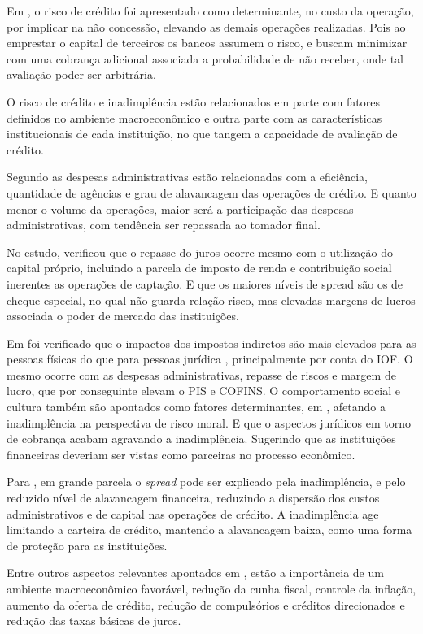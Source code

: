 \documentclass[
  12pt,
  12pt,
  openright,
  oneside,
  a4paper,
  chapter=TITLE,
  section=TITLE,
  subsection=TITLE,
  subsubsection=TITLE,
  english,
  portugues,
  sumario=tradicional]{abntex2}
\begin{document}
Em \textcite{BCB:1999}, o risco de crédito foi apresentado como determinante, no custo da operação, por implicar na não concessão, elevando as demais operações realizadas. Pois ao emprestar o capital de terceiros os bancos assumem o risco, e buscam minimizar com uma cobrança adicional associada a probabilidade de não receber, onde tal avaliação poder ser arbitrária.

O risco de crédito e inadimplência estão relacionados em parte com fatores definidos no ambiente macroeconômico e outra parte com as características institucionais de cada instituição, no que tangem a capacidade de avaliação de crédito.

Segundo \textcite{BCB:1999} as despesas administrativas estão relacionadas com a eficiência, quantidade de agências e grau de alavancagem das operações de crédito. E quanto menor o volume da operações, maior será a participação das despesas administrativas, com tendência ser repassada ao tomador final.

No estudo, \textcite{BCB:1999} verificou que o repasse do juros ocorre mesmo com o utilização do capital próprio, incluindo a parcela de imposto de renda e contribuição social inerentes as operações de captação. E que os maiores níveis de spread são os de cheque especial, no qual não guarda relação risco, mas elevadas margens de lucros associada o poder de mercado das instituições.

Em \textcite{BCB:1999} foi verificado que o impactos dos impostos indiretos são mais elevados para as pessoas físicas do que para pessoas jurídica , principalmente por conta do IOF. O mesmo ocorre com as despesas administrativas, repasse de riscos e margem de lucro, que por conseguinte elevam o PIS e COFINS.
O comportamento social e cultura também são apontados como fatores determinantes, em \textcite{BCB:1999}, afetando a inadimplência na perspectiva de risco moral. E que o aspectos jurídicos em torno de cobrança acabam agravando a inadimplência. Sugerindo que as instituições financeiras deveriam ser vistas como parceiras no processo econômico.

Para \textcite{BCB:1999}, em grande parcela o \emph{spread} pode ser explicado pela inadimplência, e pelo reduzido nível de alavancagem financeira, reduzindo a dispersão dos custos administrativos e de capital nas operações de crédito. A inadimplência age limitando a carteira de crédito, mantendo a alavancagem baixa, como uma forma de proteção para as instituições.

Entre outros aspectos relevantes apontados em \textcite{BCB:1999}, estão a importância de um ambiente macroeconômico favorável, redução da cunha fiscal, controle da inflação, aumento da oferta de crédito, redução de compulsórios e créditos direcionados e redução das taxas básicas de juros.
\end{document}
